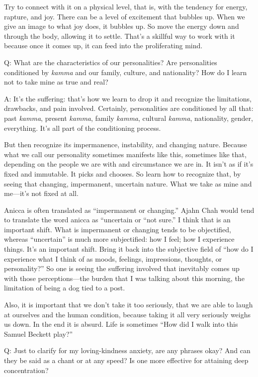 Try to connect with it on a physical level, that is, with the tendency
for energy, rapture, and joy. There can be a level of excitement that
bubbles up. When we give an image to what joy does, it bubbles up. So
move the energy down and through the body, allowing it to settle. That’s
a skillful way to work with it because once it comes up, it can feed
into the proliferating mind.

Q: What are the characteristics of our personalities? Are personalities
conditioned by \emph{kamma} and our family, culture, and nationality?
How do I learn not to take mine as true and real?

A: It’s the suffering: that’s how we learn to drop it and recognize the
limitations, drawbacks, and pain involved. Certainly, personalities are
conditioned by all that: past \emph{kamma}, present \emph{kamma}, family
\emph{kamma}, cultural \emph{kamma}, nationality, gender, everything.
It’s all part of the conditioning process.

But then recognize its impermanence, instability, and changing nature.
Because what we call our personality sometimes manifests like this,
sometimes like that, depending on the people we are with and
circumstance we are in. It isn’t as if it’s fixed and immutable. It
picks and chooses. So learn how to recognize that, by seeing that
changing, impermanent, uncertain nature. What we take as mine and
me—it’s not fixed at all.

Anicca is often translated as “impermanent or changing.” Ajahn Chah
would tend to translate the word anicca as “uncertain or “not sure.” I
think that is an important shift. What is impermanent or changing tends
to be objectified, whereas “uncertain” is much more subjectified: how I
feel; how I experience things. It’s an important shift. Bring it back
into the subjective field of “how do I experience what I think of as
moods, feelings, impressions, thoughts, or personality?” So one is
seeing the suffering involved that inevitably comes up with those
perceptions—the burden that I was talking about this morning, the
limitation of being a dog tied to a post.

Also, it is important that we don’t take it too seriously, that we are
able to laugh at ourselves and the human condition, because taking it
all very seriously weighs us down. In the end it is absurd. Life is
sometimes “How did I walk into this Samuel Beckett play?”

Q: Just to clarify for my loving-kindness anxiety, are any phrases okay?
And can they be said as a chant or at any speed? Is one more effective
for attaining deep concentration?


